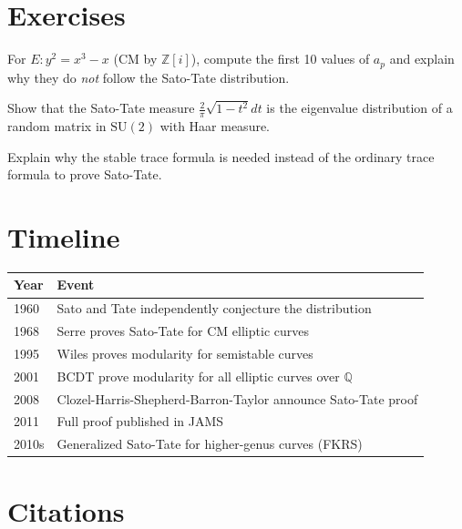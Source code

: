 \section{Exercises}

\begin{exercise}[Basic]
For $E: y^2 = x^3 - x$ (CM by $\mathbb{Z}[i]$), compute the first 10 values of $a_p$ and explain why they do \emph{not} follow the Sato-Tate distribution.
\end{exercise}

\begin{exercise}[Intermediate]
Show that the Sato-Tate measure $\frac{2}{\pi}\sqrt{1-t^2} dt$ is the eigenvalue distribution of a random matrix in $\text{SU}(2)$ with Haar measure.
\end{exercise}

\begin{exercise}[Challenge]
Explain why the stable trace formula is needed instead of the ordinary trace formula to prove Sato-Tate.
\end{exercise}

\section{Timeline}

\begin{tabularx}{\linewidth}{lX}
\toprule
\textbf{Year} & \textbf{Event} \\ \midrule
1960 & Sato and Tate independently conjecture the distribution \\ 
1968 & Serre proves Sato-Tate for CM elliptic curves \\ 
1995 & Wiles proves modularity for semistable curves \\ 
2001 & BCDT prove modularity for all elliptic curves over $\mathbb{Q}$ \\ 
2008 & Clozel-Harris-Shepherd-Barron-Taylor announce Sato-Tate proof \\ 
2011 & Full proof published in JAMS \\ 
2010s & Generalized Sato-Tate for higher-genus curves (FKRS) \\ \bottomrule
\end{tabularx}

\section{Citations}

